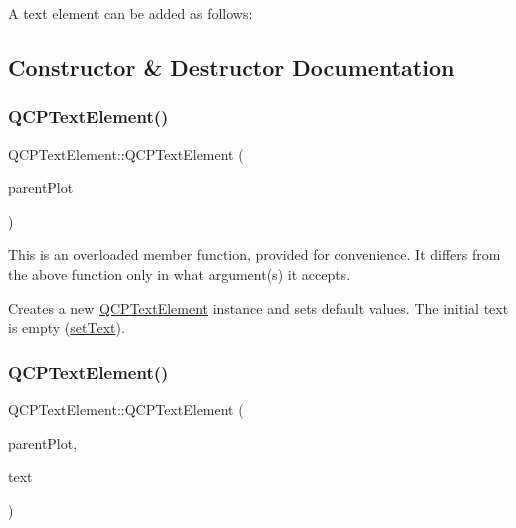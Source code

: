 A text element can be added as follows\+: 
\begin{DoxyCodeInclude}{0}
\end{DoxyCodeInclude}


\subsection{Constructor \& Destructor Documentation}
\mbox{\label{class_q_c_p_text_element_ae1de18bdb1e7ba959f132018dd9a0258}} 
\subsubsection{\texorpdfstring{QCPTextElement()}{QCPTextElement()}\hspace{0.1cm}{\footnotesize\ttfamily [1/5]}}
{\footnotesize\ttfamily Q\+C\+P\+Text\+Element\+::\+Q\+C\+P\+Text\+Element (\begin{DoxyParamCaption}\item[{\mbox{\hyperlink{class_q_custom_plot}{Q\+Custom\+Plot}} $\ast$}]{parent\+Plot }\end{DoxyParamCaption})\hspace{0.3cm}{\ttfamily [explicit]}}

This is an overloaded member function, provided for convenience. It differs from the above function only in what argument(s) it accepts.

Creates a new \mbox{\hyperlink{class_q_c_p_text_element}{Q\+C\+P\+Text\+Element}} instance and sets default values. The initial text is empty (\mbox{\hyperlink{class_q_c_p_text_element_ac44b81e69e719b879eb2feecb33557e2}{set\+Text}}). \mbox{\label{class_q_c_p_text_element_a00f08a8a3363ad8d7d12ca0db4922b6b}} 
\subsubsection{\texorpdfstring{QCPTextElement()}{QCPTextElement()}\hspace{0.1cm}{\footnotesize\ttfamily [2/5]}}
{\footnotesize\ttfamily Q\+C\+P\+Text\+Element\+::\+Q\+C\+P\+Text\+Element (\begin{DoxyParamCaption}\item[{\mbox{\hyperlink{class_q_custom_plot}{Q\+Custom\+Plot}} $\ast$}]{parent\+Plot,  }\item[{const Q\+String \&}]{text }\end{DoxyParamCaption})}

